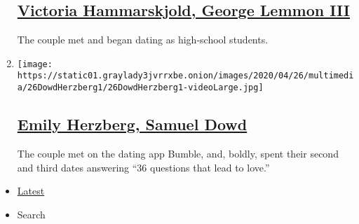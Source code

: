 \begin{enumerate}
  \hypertarget{victoria-hammarskjold-george-lemmon-iii}{%
  \subsection{\texorpdfstring{\href{/2020/05/10/fashion/weddings/victoria-hammarskjold-george-lemmon-iii.html}{Victoria
  Hammarskjold, George Lemmon
  III}}{Victoria Hammarskjold, George Lemmon III}}\label{victoria-hammarskjold-george-lemmon-iii}}

  The couple met and began dating as high-school students.
\item
  \texttt{[image: https://static01.graylady3jvrrxbe.onion/images/2020/04/26/multimedia/26DowdHerzberg1/26DowdHerzberg1-videoLarge.jpg]}

  \hypertarget{emily-herzberg-samuel-dowd}{%
  \subsection{\texorpdfstring{\href{/2020/04/26/fashion/weddings/emily-herzberg-samuel-dowd.html}{Emily
  Herzberg, Samuel
  Dowd}}{Emily Herzberg, Samuel Dowd}}\label{emily-herzberg-samuel-dowd}}

  The couple met on the dating app Bumble, and, boldly, spent their
  second and third dates answering ``36 questions that lead to love.''
\end{enumerate}

\begin{itemize}
\tightlist
\item
  \protect\hyperlink{stream-panel}{Latest}
\item
  Search
\end{itemize}

